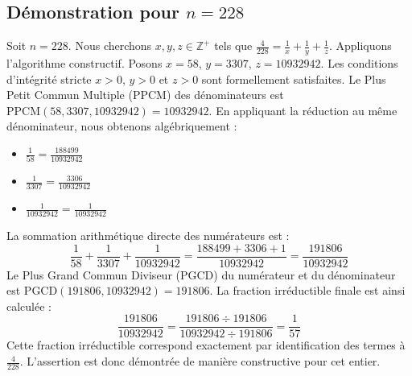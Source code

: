 \documentclass[11pt,a4paper]{article}
\begin{document}
\subsection{Démonstration pour $n = 228$}
Soit $n = 228$. Nous cherchons $x, y, z \in \mathbb{Z}^{+}$ tels que $\frac{4}{228} = \frac{1}{x} + \frac{1}{y} + \frac{1}{z}$.
Appliquons l'algorithme constructif. Posons $x = 58$, $y = 3307$, $z = 10932942$.
Les conditions d'intégrité stricte $x > 0$, $y > 0$ et $z > 0$ sont formellement satisfaites.
Le Plus Petit Commun Multiple (PPCM) des dénominateurs est $\text{PPCM}(58, 3307, 10932942) = 10932942$.
En appliquant la réduction au même dénominateur, nous obtenons algébriquement :
\begin{itemize}
    \item $\frac{1}{58} = \frac{188499}{10932942}$
    \item $\frac{1}{3307} = \frac{3306}{10932942}$
    \item $\frac{1}{10932942} = \frac{1}{10932942}$
\end{itemize}
La sommation arithmétique directe des numérateurs est :
$$ \frac{1}{58} + \frac{1}{3307} + \frac{1}{10932942} = \frac{188499 + 3306 + 1}{10932942} = \frac{191806}{10932942} $$
Le Plus Grand Commun Diviseur (PGCD) du numérateur et du dénominateur est $\text{PGCD}(191806, 10932942) = 191806$.
La fraction irréductible finale est ainsi calculée :
$$ \frac{191806}{10932942} = \frac{191806 \div 191806}{10932942 \div 191806} = \frac{1}{57} $$
Cette fraction irréductible correspond exactement par identification des termes à $\frac{4}{228}$. L'assertion est donc démontrée de manière constructive pour cet entier.
\end{document}
